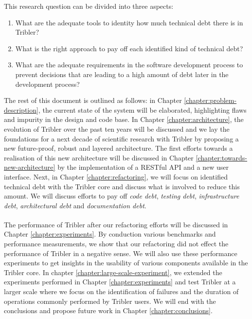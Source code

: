 This research question can be divided into three aspects:
\begin{enumerate}
	\item What are the adequate tools to identity how much technical debt there is in Tribler?
	\item What is the right approach to pay off each identified kind of technical debt?
	\item What are the adequate requirements in the software development process to prevent decisions that are leading to a high amount of debt later in the development process?
\end{enumerate}
The rest of this document is outlined as follows: in Chapter \ref{chapter:problem-description}, the current state of the system will be elaborated, highlighting flaws and impurity in the design and code base. 
In Chapter \ref{chapter:architecture}, the evolution of Tribler over the past ten years will be discussed and we lay the foundations for a next decade of scientific research with Tribler by proposing a new future-proof, robust and layered architecture.
The first efforts towards a realisation of this new architecture will be discussed in Chapter \ref{chapter:towards-new-architecture} by the implementation of a RESTful API and a new user interface.
Next, in Chapter \ref{chapter:refactoring}, we will focus on identified technical debt with the Tribler core and discuss what is involved to reduce this amount. 
We will discuss efforts to pay off \emph{code debt}, \emph{testing debt}, \emph{infrastructure debt}, \emph{architectural debt} and \emph{documentation debt}.\\\\
The performance of Tribler after our refactoring efforts will be discussed in Chapter \ref{chapter:experiments}.
By conduction various benchmarks and performance measurements, we show that our refactoring did not effect the performance of Tribler in a negative sense.
We will also use these performance experiments to get insights in the usability of various components available in the Tribler core.
In chapter \ref{chapter:large-scale-experiment}, we extended the experiments performed in Chapter \ref{chapter:experiments} and test Tribler at a larger scale where we focus on the identification of failures and the duration of operations commonly performed by Tribler users.
We will end with the conclusions and propose future work in Chapter \ref{chapter:conclusions}.
